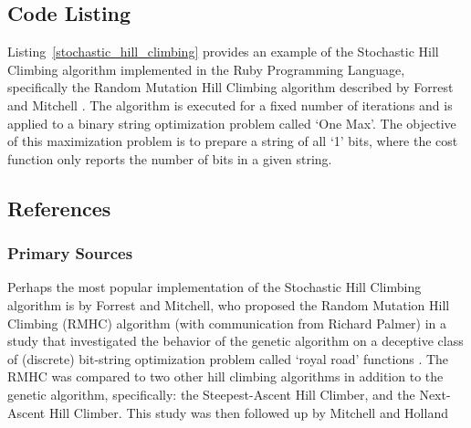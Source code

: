 \subsection{Code Listing}
Listing~\ref{stochastic_hill_climbing} provides an example of the Stochastic Hill Climbing algorithm implemented in the Ruby Programming Language, specifically the Random Mutation Hill Climbing algorithm described by Forrest and Mitchell \cite{Forrest1993}.
The algorithm is executed for a fixed number of iterations and is applied to a binary string optimization problem called `One Max'. The objective of this maximization problem is to prepare a string of all `1' bits, where the cost function only reports the number of bits in a given string.


\subsection{References}

% 
% 
\subsubsection{Primary Sources}
Perhaps the most popular implementation of the Stochastic Hill Climbing algorithm is by Forrest and Mitchell, who proposed the Random Mutation Hill Climbing (RMHC) algorithm (with communication from Richard Palmer) in a study that investigated the behavior of the genetic algorithm on a deceptive class of (discrete) bit-string optimization problem called `royal road' functions \cite{Forrest1993}. The RMHC was compared to two other hill climbing algorithms in addition to the genetic algorithm, specifically: the Steepest-Ascent Hill Climber, and the Next-Ascent Hill Climber. This study was then followed up by Mitchell and Holland \cite{Mitchell1993}

